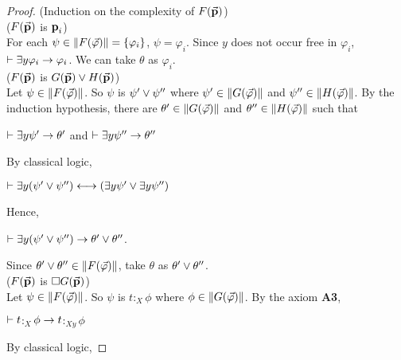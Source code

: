 \begin{proof} (Induction on the complexity of $F(\vec{\textbf{p}})$)\\
	
	
	($F(\vec{\textbf{p}})$ is $\textbf{p}_{i}$)\\
	
	\qquad  For each $\psi \in \Arrowvert F(\vec{\varphi}) \Arrowvert =\{ \varphi_{i}  \}$,  $\psi = \varphi_{i}$. Since $y$ does not occur free in $\varphi_{i}$, $\vdash \exists y\varphi_{i} \rightarrow \varphi_{i}$. We can take $\theta$ as $\varphi_{i}$.\\
	
	($F(\vec{\textbf{p}})$ is $G(\vec{\textbf{p}})\vee H(\vec{\textbf{p}})$)\\
	
	\qquad Let $\psi \in \Arrowvert F(\vec{\varphi}) \Arrowvert$. So $\psi$ is $\psi^{\prime} \vee \psi^{\prime\prime}$ where  $\psi^{\prime} \in \Arrowvert G(\vec{\varphi}) \Arrowvert$ and  $\psi^{\prime\prime} \in \Arrowvert H(\vec{\varphi}) \Arrowvert$. By the induction hypothesis, there are $\theta^{\prime} \in \Arrowvert G(\vec{\varphi}) \Arrowvert$ and  $\theta^{\prime\prime} \in \Arrowvert H(\vec{\varphi}) \Arrowvert$ such that
	
	\begin{center}
		$\vdash \exists y \psi^{\prime} \rightarrow \theta^{\prime}$ and $\vdash \exists y\psi^{\prime\prime} \rightarrow \theta^{\prime\prime}$
	\end{center}    
By classical logic,
	
	
	\begin{center}
		$\vdash \exists y (\psi^{\prime} \vee \psi^{\prime\prime}) \longleftrightarrow  (\exists y\psi^{\prime} \vee \exists y\psi^{\prime\prime})$
	\end{center}     
Hence,
	
	\begin{center}
		$\vdash \exists y (\psi^{\prime} \vee \psi^{\prime\prime}) \rightarrow \theta^{\prime} \vee \theta^{\prime\prime}$.
	\end{center}
	
	
	\qquad Since $\theta^{\prime} \vee \theta^{\prime\prime} \in \Arrowvert F(\vec{\varphi}) \Arrowvert$, take $\theta$ as $\theta^{\prime} \vee \theta^{\prime\prime}$.\\
	
	
	
	($F(\vec{\textbf{p}})$ is $\Box G(\vec{\textbf{p}})$)\\
	
	
	\qquad Let $\psi \in \Arrowvert F(\vec{\varphi}) \Arrowvert$. So $\psi$ is $t$$:_{X}$$\phi$ where $\phi \in \Arrowvert G(\vec{\varphi}) \Arrowvert$. By the axiom \textbf{A3}, 
	
	\begin{center}
		$\vdash t$$:_{X}$$\phi \rightarrow t$$:_{Xy}$$\phi$
	\end{center}
By classical logic,
	

\end{proof}
